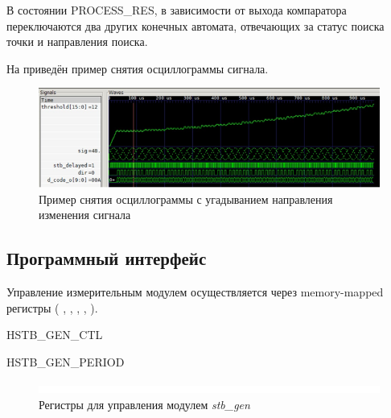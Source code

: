 В состоянии PROCESS\_RES, в зависимости от выхода компаратора переключаются два других конечных автомата, отвечающих за статус поиска точки и направления поиска.

На  приведён пример снятия осциллограммы сигнала.

\begin{figure}[ht!] 
	\center
	\includegraphics  {my_folder/images//p_find}
	\caption{Пример снятия осциллограммы с угадыванием направления изменения сигнала} 
	\label{fig:p-find}  
\end{figure}

\subsection{Программный интерфейс}

Управление измерительным модулем осуществляется через memory-mapped регистры ( , ,
, , 
).

\begin{register}{H}{STB\_GEN\_CTL}{}%
\label{example}%
%
%
%
%
 \regnewline%

%
%
%
%
\regnewline%
\end{register}

\begin{register}{H}{STB\_GEN\_PERIOD}{}%
\label{example}%
%
 \regnewline%
\end{register}

\begin{figure}[ht!] 
	\center
	\includegraphics  {my_folder/images//blank}
	\caption{Регистры для управления модулем \emph{stb\_gen}} 
	\label{fig:stb-reg}  
\end{figure}

